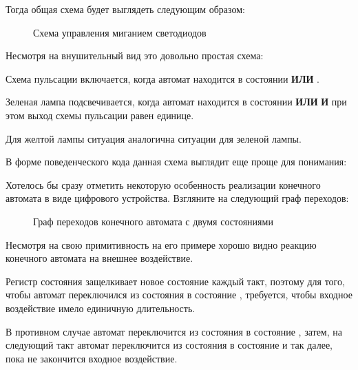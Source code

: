 \par{Тогда общая схема будет выглядеть следующим образом:}

\begin{figure}[H]
  \centering
  \def\svgwidth{\columnwidth}
  
  \caption{Схема управления миганием светодиодов}
\end{figure}

\par{Несмотря на внушительный вид это довольно простая схема:}

\par{Схема пульсации включается, когда автомат находится в состоянии  \textbf{ИЛИ} .}

\par{Зеленая лампа подсвечивается, когда автомат находится в состоянии  \textbf{ИЛИ}  \textbf{И} при этом выход схемы пульсации равен единице.}

\par{Для желтой лампы ситуация аналогична ситуации для зеленой лампы.}

\par{В форме поведенческого кода данная схема выглядит еще проще для понимания:}



\par{Хотелось бы сразу отметить некоторую особенность реализации конечного автомата в виде цифрового устройства. Взгляните на следующий граф переходов:}

\begin{figure}[H]
  \centering
  \def\svgwidth{\columnwidth}
  
  \caption{Граф переходов конечного автомата с двумя состояниями}
\end{figure}

\par{Несмотря на свою примитивность на его примере хорошо видно реакцию конечного автомата на внешнее воздействие.}

\par{Регистр состояния защелкивает новое состояние каждый такт, поэтому для того, чтобы автомат переключился из состояния  в состояние , требуется, чтобы входное воздействие  имело единичную длительность.}

\par{В противном случае автомат переключится из состояния  в состояние , затем, на следующий такт автомат переключится из состояния  в состояние  и так далее, пока не закончится входное воздействие.}

